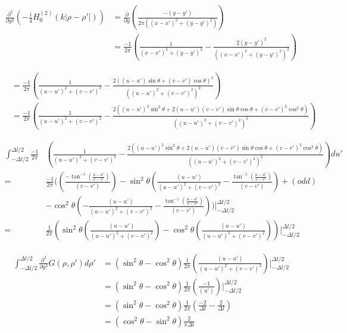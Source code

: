 \documentclass{article}
\newcommand{\0}{\varnothing}
\begin{document}
\begin{align*}
    \frac{\partial^2}{\partial y^2}\left(-\frac{i}{4}H_0^{(2)}(k|\rho-\rho'|)\right) &= \frac{\partial}{\partial y}\left(\frac{-(y-y')}{2\pi((x-x')^2+(y-y')^2)}\right)\\
        &=\frac{-1}{2\pi}\left(\frac{1}{(x-x')^2+(y-y')^2} - \frac{2(y-y')^2}{((x-x')^2+(y-y')^2)^2}\right)
\end{align*}


\begin{align*}
    &=\frac{-1}{2\pi}\left(\frac{1}{(u-u')^2+(v-v')^2} - \frac{2((u-u')\sin{\theta} + (v-v')\cos{\theta})^2}{((u-u')^2+(v-v')^2)^2}\right)\\
    &=\frac{-1}{2\pi}\left(\frac{1}{(u-u')^2+(v-v')^2} - \frac{2((u-u')^2\sin^2{\theta} + 2(u-u')(v-v')\sin{\theta}\cos{\theta}+(v-v')^2\cos^2{\theta})}{((u-u')^2+(v-v')^2)^2}\right)
\end{align*}


\begin{align*}
    \int_{-\Delta l/2}^{\Delta l/2}\frac{-1}{2\pi}&\left(\frac{1}{(u-u')^2+(v-v')^2} - \frac{2((u-u')^2\sin^2{\theta} + 2(u-u')(v-v')\sin{\theta}\cos{\theta}+(v-v')^2\cos^2{\theta})}{((u-u')^2+(v-v')^2)^2}\right)du'\\
    =&\frac{-1}{2\pi}(\left(\frac{-\tan^{-1}(\frac{u-u'}{v-v'})}{(v-v')}\right) - \sin^2{\theta}\left(\frac{(u-u')}{(u-u')^2 + (v-v')^2} - \frac{\tan^{-1}(\frac{u-u'}{v-v'})}{(v-v')}\right) + (odd)\\
        &-\cos^2{\theta}\left(-\frac{(u-u')}{(u-u')^2 + (v-v')^2} - \frac{\tan^{-1}(\frac{u-u'}{v-v'})}{(v-v')}\right))|_{-\Delta l/2}^{\Delta l/2}\\
    =&\frac{1}{2\pi}\left(\sin^2{\theta}\left(\frac{(u-u')}{(u-u')^2 + (v-v')^2}\right) -\cos^2{\theta}\left(\frac{(u-u')}{(u-u')^2 + (v-v')^2}\right)\right)|_{-\Delta l/2}^{\Delta l/2}
\end{align*}

\begin{align*}
    \int_{-\Delta l/2}^{\Delta l/2}\frac{\partial^2}{\partial y^2}G(\rho, \rho')d\rho' &= \left(\sin^2\theta - \cos^2\theta\right)\frac{1}{2\pi}\left(\frac{(u-u')}{(u-u')^2 + (v-v')^2}\right)|_{-\Delta l/2}^{\Delta l/2}\\
    &=\left(\sin^2\theta - \cos^2\theta\right)\frac{1}{2\pi}\left(\frac{-1}{(u')}\right)|_{-\Delta l/2}^{\Delta l/2}\\
    &=\left(\sin^2\theta - \cos^2\theta\right)\frac{1}{2\pi}\left(\frac{-2}{\Delta l} - \frac{2}{\Delta l}\right)\\
    &=\left(\cos^2\theta - \sin^2\theta\right)\frac{2}{\pi\Delta l}
\end{align*}
\end{document}
